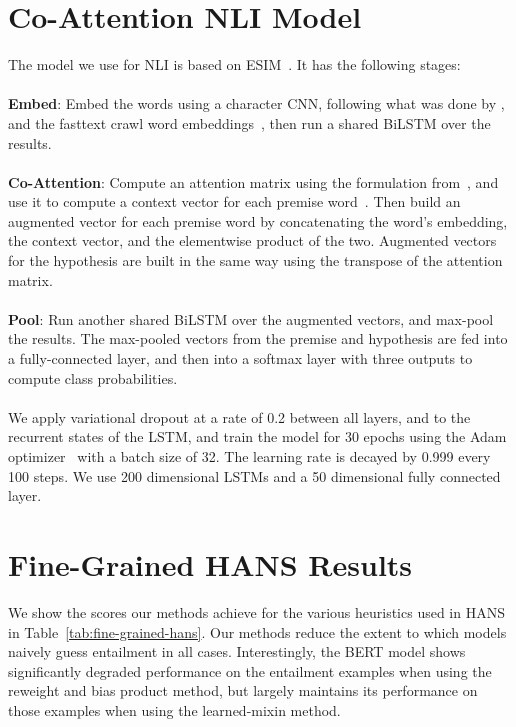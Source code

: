 \documentclass[11pt,a4paper]{article}
\begin{document}
\section{Co-Attention NLI Model}
\label{appendix:nli_model}
\label{sect:co-attention-model}
The model we use for NLI is based on ESIM~\cite{chen2016enhanced}. It has the following stages:
\\
\\
\noindent
\textbf{Embed}: Embed the words using a character CNN, following what was done by \citet{seo2016bidirectional}, and the fasttext crawl word embeddings~\cite{fasttext_word_vectors}, then run a shared BiLSTM over the results.
\\
\\
\noindent
\textbf{Co-Attention}: Compute an attention matrix using the formulation from~\citet{seo2016bidirectional}, and use it to compute a context vector for each premise word~\cite{bahdanau2014neural}. Then build an augmented vector for each premise word by concatenating the word's embedding, the context vector, and the elementwise product of the two.
Augmented vectors for the hypothesis are built in the same way using the transpose of the attention matrix.
\\
\\
\noindent
\textbf{Pool}: Run another shared BiLSTM over the augmented vectors, and max-pool the results. 
The max-pooled vectors from the premise and hypothesis are fed into a fully-connected layer, and then into a softmax layer with three outputs to compute class probabilities.
\\
\\
We apply variational dropout at a rate of 0.2 between all layers, and to the recurrent states of the LSTM, and train the model for 30 epochs using the Adam optimizer~\cite{adam} with a batch size of 32. The learning rate is decayed by 0.999 every 100 steps. We use 200 dimensional LSTMs and a 50 dimensional fully connected layer.

\section{Fine-Grained HANS Results}
We show the scores our methods achieve for the various heuristics used in HANS in Table~\ref{tab:fine-grained-hans}. Our methods reduce the extent to which models naively guess entailment in all cases. Interestingly, the BERT model shows significantly degraded performance on the entailment examples when using the reweight and bias product method, but largely maintains its performance on those examples when using the learned-mixin method.
\end{document}
